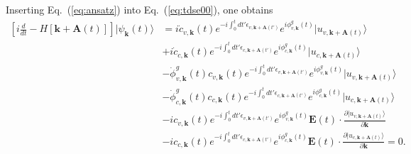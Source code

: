 Inserting Eq.~(\ref{eq:ansatz}) into Eq.~(\ref{eq:tdse00}), one obtains
\begin{align}
	\left [i\frac{d}{dt}-H\left [\mathbf k + \mathbf A(t) \right ] \right ]|\psi_{\mathbf k}(t) \rangle & =
	i \dot c_{v,\mathbf k}(t) e^{-i\int^t_0dt' \epsilon_{v,\mathbf k+ \mathbf A(t')}} e^{i\phi^g_{v,\mathbf k}(t)} |u_{v,\mathbf k+\mathbf A(t)}\rangle \nonumber                                                                                                                                                          \\
	                                                                                                    & + i\dot c_{c,\mathbf k}(t) e^{-i\int^t_0dt' \epsilon_{c,\mathbf k+ \mathbf A(t')}} e^{i\phi^g_{c,\mathbf k}(t)} |u_{c,\mathbf k+\mathbf A(t)}\rangle \nonumber                                                   \\
	                                                                                                    & - \dot \phi^g_{v,\mathbf k}(t) c_{v,\mathbf k}(t) e^{-i\int^t_0dt' \epsilon_{v,\mathbf k+ \mathbf A(t')}} e^{i\phi^g_{v,\mathbf k}(t)} |u_{v,\mathbf k+\mathbf A(t)}\rangle \nonumber                            \\
	                                                                                                    & - \dot \phi^g_{c,\mathbf k}(t) c_{c,\mathbf k}(t) e^{-i\int^t_0dt' \epsilon_{c,\mathbf k+ \mathbf A(t')}} e^{i\phi^g_{c,\mathbf k}(t)} |u_{c,\mathbf k+\mathbf A(t)}\rangle \nonumber                            \\
	                                                                                                    & - i c_{v,\mathbf k}(t) e^{-i\int^t_0dt' \epsilon_{v,\mathbf k+ \mathbf A(t')}} e^{i\phi^g_{v,\mathbf k}(t)} \mathbf E(t)\cdot \frac{\partial |u_{v,\mathbf k+\mathbf A(t)}\rangle}{\partial \mathbf k} \nonumber \\
	                                                                                                    & - i c_{c,\mathbf k}(t) e^{-i\int^t_0dt' \epsilon_{c,\mathbf k+ \mathbf A(t')}} e^{i\phi^g_{c,\mathbf k}(t)} \mathbf E(t)\cdot \frac{\partial |u_{c,\mathbf k+\mathbf A(t)}\rangle}{\partial \mathbf k} = 0.
	\label{eq:tdse01}
\end{align}

